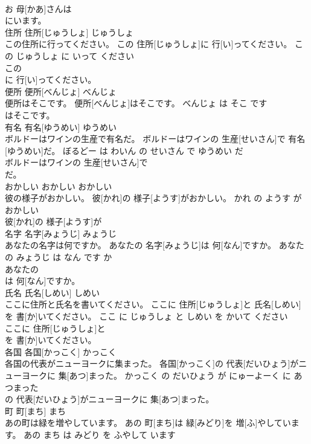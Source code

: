 \documentclass[8pt]{extreport}
\begin{document}
\begin{CJK}{UTF8}{min}
\\	お 母[かあ]さんは
\\	にいます。		
\\	住所	住所[じゅうしょ]	じゅうしょ	
\\	この住所に行ってください。	この 住所[じゅうしょ]に 行[い]ってください。	この じゅうしょ に いって ください	
\\	この
\\	に 行[い]ってください。		
\\	便所	便所[べんじょ]	べんじょ	
\\	便所はそこです。	便所[べんじょ]はそこです。	べんじょ は そこ です	
\\	はそこです。		
\\	有名	有名[ゆうめい]	ゆうめい	
\\	ボルドーはワインの生産で有名だ。	ボルドーはワインの 生産[せいさん]で 有名[ゆうめい]だ。	ぼるどー は わいん の せいさん で ゆうめい だ	
\\	ボルドーはワインの 生産[せいさん]で
\\	だ。		
\\	おかしい	おかしい	おかしい	
\\	彼の様子がおかしい。	彼[かれ]の 様子[ようす]がおかしい。	かれ の ようす が おかしい	
\\	彼[かれ]の 様子[ようす]が
\\	名字	名字[みょうじ]	みょうじ	
\\	あなたの名字は何ですか。	あなたの 名字[みょうじ]は 何[なん]ですか。	あなた の みょうじ は なん です か	
\\	あなたの
\\	は 何[なん]ですか。		
\\	氏名	氏名[しめい]	しめい	
\\	ここに住所と氏名を書いてください。	ここに 住所[じゅうしょ]と 氏名[しめい]を 書[か]いてください。	ここ に じゅうしょ と しめい を かいて ください	
\\	ここに 住所[じゅうしょ]と
\\	を 書[か]いてください。		
\\	各国	各国[かっこく]	かっこく	
\\	各国の代表がニューヨークに集まった。	各国[かっこく]の 代表[だいひょう]がニューヨークに 集[あつ]まった。	かっこく の だいひょう が にゅーよーく に あつまった	
\\	の 代表[だいひょう]がニューヨークに 集[あつ]まった。		
\\	町	町[まち]	まち	
\\	あの町は緑を増やしています。	あの 町[まち]は 緑[みどり]を 増[ふ]やしています。	あの まち は みどり を ふやして います	

\end{CJK}
\end{document}
